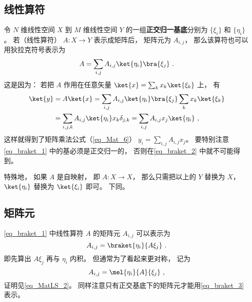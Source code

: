 \subsection{线性算符}
令 $N$ 维线性空间 $X$ 到 $M$ 维线性空间 $Y$ 的一组\textbf{正交归一基底}分别为 $\{\xi_i\}$ 和 $\{\eta_i\}$。 若（线性算符） $A:X\to Y$ 表示成矩阵后， 矩阵元为 $A_{i,j}$， 那么该算符也可以用狄拉克符号表示为
\begin{equation}\label{eq_braket_1}
A = \sum_{i,j} A_{i,j} \ket{\eta_i}\bra{\xi_j}~.
\end{equation}
这是因为： 若把 $A$ 作用在任意矢量 $\ket{x} = \sum_k x_k\ket{\xi_k}$ 上， 有
\begin{equation}\label{eq_braket_2}
\begin{aligned}
\ket{y} &= A\ket{x} = \sum_{i,j} A_{i,j} \ket{\eta_i}\bra{\xi_j} \sum_k x_k\ket{\xi_k}\\
&= \sum_{i,j, k} A_{i,j} \ket{\eta_i} x_k \delta_{j,k}
= \sum_{i,j} A_{i,j} x_j \ket{\eta_i}~,
\end{aligned}
\end{equation}
这样就得到了矩阵乘法公式（\autoref{eq_Mat_6}） $y_i = \sum_{i,j} A_{i,j} x_j$。 要特别注意\autoref{eq_braket_1} 中的基必须是正交归一的， 否则在\autoref{eq_braket_2} 中就不可能得到。

特殊地， 如果 $A$ 是自映射， 即 $A:X\to X$， 那么只需把以上的 $Y$ 替换为 $X$， $\ket{\eta_i}$ 替换为 $\ket{\xi_i}$ 即可。 下同。

\subsection{矩阵元}
\autoref{eq_braket_1} 中线性算符 $A$ 的矩阵元 $A_{i,j}$ 可以表示为
\begin{equation}
A_{i,j} = \braket{\eta_i}{A\xi_j}~.
\end{equation}
即先算出 $A\xi_j$ 再与 $\eta_i$ 内积。 但通常为了看起来更对称， 记为
\begin{equation}\label{eq_braket_3}
A_{i,j} = \mel{\eta_i}{A}{\xi_j}~,
\end{equation}
证明见\autoref{eq_MatLS_2}。 同样注意只有正交基底下的矩阵元才能用\autoref{eq_braket_3} 表示。
